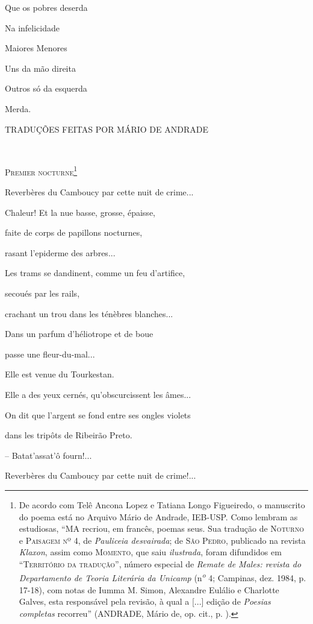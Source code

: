 Que os pobres deserda

Na infelicidade

Maiores Menores

Uns da mão direita

Outros só da esquerda

Merda.

\textsc{TRADUÇÕES FEITAS POR MÁRIO DE ANDRADE}

\textsc{\\
}

\textsc{Premier nocturne}\footnote{De acordo com Telê Ancona Lopez e
  Tatiana Longo Figueiredo, o manuscrito do poema está no Arquivo Mário
  de Andrade, IEB-USP. Como lembram as estudiosas, ``MA recriou, em
  francês, poemas seus. Sua tradução de \textsc{Noturno} e
  \textsc{Paisagem nº 4,} de \emph{Pauliceia desvairada}; de \textsc{São
  Pedro,} publicado na revista \emph{Klaxon}, assim como
  \textsc{Momento}, que saiu \emph{ilustrada}, foram difundidos em
  ``\textsc{Território da tradução}'', número especial de \emph{Remate
  de Males: revista do Departamento de Teoria Literária da Unicamp}
  (n\textsuperscript{\emph{o}} 4; Campinas, dez. 1984, p. 17-18), com
  notas de Iumma M. Simon, Alexandre Eulálio e Charlotte Galves, esta
  responsável pela revisão, à qual a {[}...{]} edição de \emph{Poesias
  completas} recorreu'' (ANDRADE, Mário de, op. cit., p. ).}

Reverbères du Camboucy par cette nuit de crime...

Chaleur! Et la nue basse, grosse, épaisse,

faite de corps de papillons nocturnes,

rasant l'epiderme des arbres...

Les trams se dandinent, comme un feu d'artifice,

secoués par les rails,

crachant un trou dans les ténèbres blanches...

Dans un parfum d'héliotrope et de boue

passe une fleur-du-mal...

Elle est venue du Tourkestan.

Elle a des yeux cernés, qu'obscurcissent les âmes...

On dit que l'argent se fond entre ses ongles violets

dans les tripôts de Ribeirão Preto.

-- Batat'assat'ô fourn!...

Reverbères du Camboucy par cette nuit de crime!...

